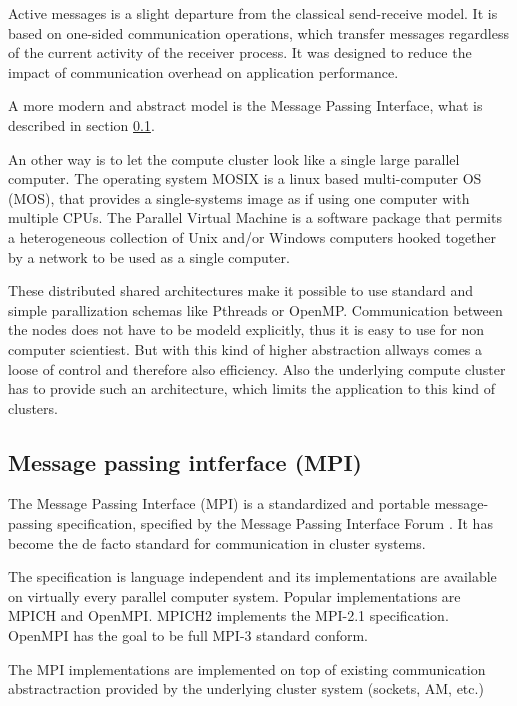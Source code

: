
Active messages \cite{ref:am} is a slight departure from the classical
send-receive model. It is based on one-sided communication operations,
which transfer messages regardless of the current activity of the
receiver process. It was designed to reduce the impact of
communication overhead on application performance.

A more modern and abstract model is the Message Passing Interface,
what is described in section \ref{sec:mpi}.

An other way is to let the compute cluster look like a single large
parallel computer. The operating system MOSIX \cite{ref:mosix} is a
linux based multi-computer OS (MOS), that provides a single-systems
image\cite{ref:single_system_image} as if using one computer with
multiple CPUs. The Parallel Virtual Machine\cite{ref:pvm} is a
software package that permits a heterogeneous collection of Unix
and/or Windows computers hooked together by a network to be used as a
single computer.

These distributed shared architectures make it possible to use
standard and simple parallization schemas like Pthreads or OpenMP.
Communication between the nodes does not have to be modeld explicitly,
thus it is easy to use for non computer scientiest. But with this kind
of higher abstraction allways comes a loose of control and therefore
also efficiency. Also the underlying compute cluster has to provide
such an architecture, which limits the application to this
kind of clusters.

\subsection{Message passing intferface (MPI)}
\label{sec:mpi}
The Message Passing Interface (MPI) is a standardized and portable
message-passing specification, specified by the Message Passing
Interface Forum \cite{ref:mpi_specification}. It has become the de
facto standard for communication in cluster systems.

The specification is language independent and its implementations are
available on virtually every parallel computer system.  Popular
implementations are MPICH and OpenMPI. MPICH2 implements the MPI-2.1
specification. OpenMPI has the goal to be full MPI-3 standard conform.

The MPI implementations are implemented on top of existing communication
abstractraction provided by the underlying cluster system (sockets,
AM, etc.)

